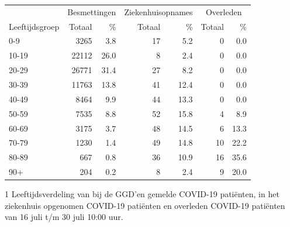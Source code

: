 \documentclass[
  english,
  man,floatsintext]{apa6}
\begin{document}
\begin{table}
\centering\begingroup\fontsize{11}{13}\selectfont

\begin{threeparttable}
\begin{tabular}{lrrrrrr}
\toprule
\multicolumn{1}{c}{ } & \multicolumn{2}{c}{Besmettingen} & \multicolumn{2}{c}{Ziekenhuisopnames} & \multicolumn{2}{c}{Overleden} \\
\cmidrule(l{3pt}r{3pt}){2-3} \cmidrule(l{3pt}r{3pt}){4-5} \cmidrule(l{3pt}r{3pt}){6-7}
Leeftijdsgroep & Totaal & \% & Totaal & \% & Totaal & \%\\
\midrule
0-9 & 3265 & 3.8 & 17 & 5.2 & 0 & 0.0\\
10-19 & 22112 & 26.0 & 8 & 2.4 & 0 & 0.0\\
20-29 & 26771 & 31.4 & 27 & 8.2 & 0 & 0.0\\
30-39 & 11763 & 13.8 & 41 & 12.4 & 0 & 0.0\\
40-49 & 8464 & 9.9 & 44 & 13.3 & 0 & 0.0\\
50-59 & 7535 & 8.8 & 52 & 15.8 & 4 & 8.9\\
60-69 & 3175 & 3.7 & 48 & 14.5 & 6 & 13.3\\
70-79 & 1230 & 1.4 & 49 & 14.8 & 10 & 22.2\\
80-89 & 667 & 0.8 & 36 & 10.9 & 16 & 35.6\\
90+ & 204 & 0.2 & 8 & 2.4 & 9 & 20.0\\
\bottomrule
\end{tabular}
\begin{tablenotes}
\item[1] Leeftijdsverdeling van bij de GGD’en gemelde COVID-19 patiënten, in het ziekenhuis opgenomen COVID-19 patiënten en overleden COVID-19 patiënten van 16 juli t/m 30 juli 10:00 uur.
\end{tablenotes}
\end{threeparttable}
\endgroup{}
\end{table}

\newpage
\end{document}
